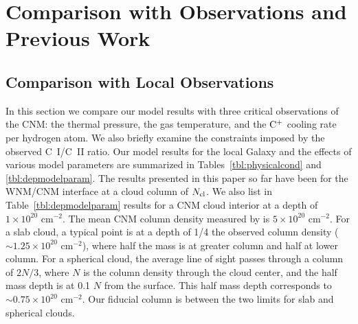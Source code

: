 \documentclass[12pt,preprint,flushrt]{aastex}
\begin{document}
\section{Comparison with Observations and Previous Work}
\label{sec:comp}

\subsection{Comparison with Local Observations}
\label{sub:local}

In this section we compare our model results with three critical
observations of the CNM: the thermal pressure, the gas temperature, and
the ${\rm C^+}$ cooling rate per hydrogen atom. We also briefly
examine the constraints imposed by the observed C~I/C~II ratio.
Our model results for the local Galaxy and the effects of various
model parameters are summarized in Tables~\ref{tbl:physicalcond} 
and \ref{tbl:depmodelparam}. The results presented in this paper
so far have been for the WNM/CNM interface at a cloud column of $N_{\rm cl}$. 
We also list in Table~\ref{tbl:depmodelparam} results for a CNM cloud 
interior at a depth of $1\times 10^{20}$ cm$^{-2}$.  
The mean CNM column density measured
by \cite{hei02} is 
$5\times 10^{20}$ cm$^{-2}$. For a slab cloud,
a typical point is at a depth of 1/4 the observed column density
($\sim 1.25\times 10^{20}$ cm$^{-2}$),
where half the mass 
is at greater column and half at lower column.
For a spherical cloud, the average line of sight passes through a
column of $2N/3$, where $N$ is the column density through the cloud
center, and the  half mass depth is at 0.1 $N$ from the
surface. This half mass depth corresponds to $\sim 0.75\times 10^{20}$
cm$^{-2}$. Our fiducial column is between the two limits for slab
and spherical clouds.
\end{document}
